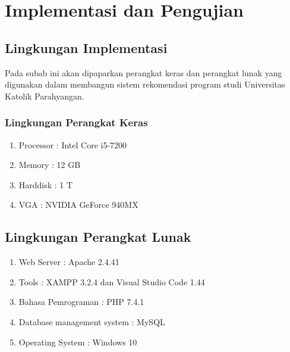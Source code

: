 \chapter{Implementasi dan Pengujian}
\label{chap:implementasi dan pengujian}

\section{Lingkungan Implementasi}
\label{sec:lingkungan implementasi}

Pada subab ini akan dipaparkan perangkat keras dan perangkat lunak yang digunakan dalam membangun sistem rekomendasi program studi Universitas Katolik Parahyangan.

\subsection{Lingkungan Perangkat Keras}
\label{sec:perangkat keras}

\begin{enumerate}
    \item Processor : Intel Core i5-7200
    
    \item Memory : 12 GB
    
    \item Harddisk : 1 T
    
    \item VGA : NVIDIA GeForce 940MX
\end{enumerate}

\section{Lingkungan Perangkat Lunak}
\label{sec:perangkat lunak}

\begin{enumerate}
    \item Web Server : Apache 2.4.41
    
    \item Tools : XAMPP 3.2.4 dan Visual Studio Code 1.44
    
    \item Bahasa Pemrograman : PHP 7.4.1
    
    \item Database management system : MySQL
    
    \item Operating System : Windows 10
\end{enumerate}

